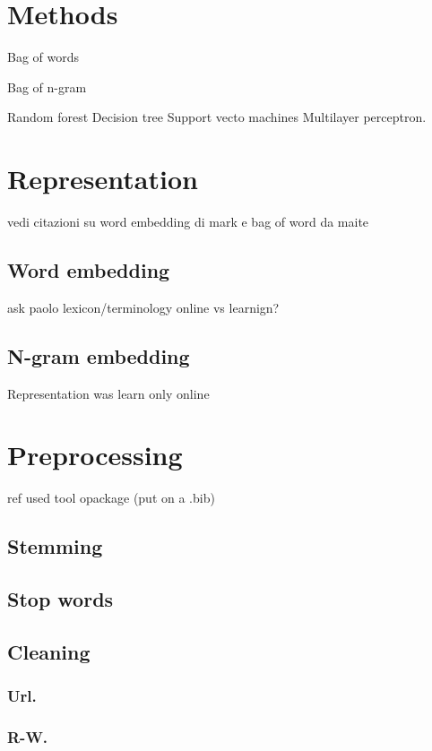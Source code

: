 \section{Methods} \label{sec:methods}

Bag of words

Bag of n-gram


Random forest
Decision tree
Support vecto machines
Multilayer perceptron.


\section{Representation}

vedi citazioni su word embedding di mark e bag of word da maite


\subsection{Word embedding}

ask paolo lexicon/terminology online vs learnign?


\subsection{N-gram embedding}

Representation was learn only online 


\section{Preprocessing}

ref used tool opackage (put on a .bib)

\subsection{Stemming}

\subsection{Stop words}

\subsection{Cleaning}

\subsubsection{Url.}
\subsubsection{R-W.}

